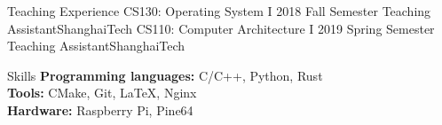 \documentclass{resume} %
\begin{document}
\begin{rSection}{Teaching Experience}
	\rItem
		{CS130: Operating System I }{ 2018 Fall Semester }
		{Teaching Assistant}{ShanghaiTech}
	\rItem
		{CS110: Computer Architecture I }{ 2019 Spring Semester }
		{Teaching Assistant}{ShanghaiTech}
\end{rSection}

\begin{rSection}{Skills}
{\bf Programming languages:} C/C++, Python, Rust\\
{\bf Tools:} CMake, Git, \LaTeX, Nginx\\
{\bf Hardware:} Raspberry Pi, Pine64
\end{rSection}
\end{document}
